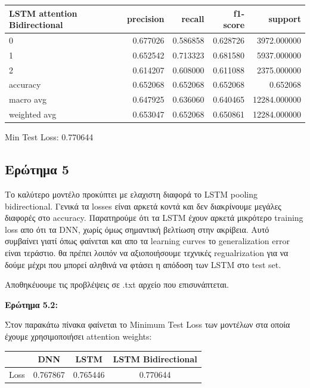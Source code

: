 \documentclass[12pt]{article}
\begin{document}
\begin{tabular}{lrrrr}
\toprule
LSTM attention Bidirectional &  precision &    recall &  f1-score &       support \\
\midrule
0            &   0.677026 &  0.586858 &  0.628726 &   3972.000000 \\
1            &   0.652542 &  0.713323 &  0.681580 &   5937.000000 \\
2            &   0.614207 &  0.608000 &  0.611088 &   2375.000000 \\
accuracy     &   0.652068 &  0.652068 &  0.652068 &      0.652068 \\
macro avg    &   0.647925 &  0.636060 &  0.640465 &  12284.000000 \\
weighted avg &   0.653047 &  0.652068 &  0.650861 &  12284.000000 \\
\bottomrule
\end{tabular}

Min Test Loss: 0.770644


\subsection{Ερώτημα 5}
Το καλύτερο μοντέλο προκύπτει με ελαχιστη διαφορά το LSTM pooling bidirectional. Γενικά τα losses είναι αρκετά κοντά και δεν διακρίνουμε μεγάλες διαφορές στο accuracy. Παρατηρούμε ότι τα LSTM έχουν αρκετά μικρότερο training loss απο ότι τα DNN, χωρίς όμως σημαντική βελτίωση στην ακρίβεια. Αυτό συμβαίνει γιατί όπως φαίνεται και απο τα learning curves το generalization error είναι τεράστιο. θα πρέπει λοιπόν να αξιοποιήσουμε τεχνικές regualrization για να δούμε μέχρι που μπορεί αληθινά να φτάσει η απόδοση των LSTM στο test set.

Αποθηκέυουμε τις προβλέψεις σε .txt αρχείο που επισυνάπτεται.  



\textbf{Ερώτημα 5.2:}

Στον παρακάτω πίνακα φαίνεται το Minimum Test Loss των μοντέλων στα οποία έχουμε χρησιμοποιήσει attention weights:

\begin{center}
\begin{tabular}{ |c|c|c|c| } 
 \hline
    &DNN & LSTM & LSTM Bidirectional \\
 \hline 
 Loss & 0.767867 & 0.765446 & 0.770644\\
  \hline 
\end{tabular}
\end{center}
\end{document}
